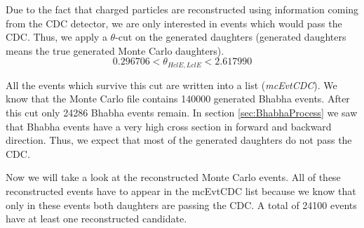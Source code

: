 \documentclass[a4paper,11pt,twosided,final,german,openbib,pdftex,listof=totoc,bibliography=totoc]{scrbook}
\begin{document}
Due to the fact that charged particles are reconstructed using information coming from the CDC detector, we are only interested in events which would pass the CDC. Thus, we apply a $\theta$-cut on the generated daughters (generated daughters means the true generated Monte Carlo daughters). 
\begin{equation}
	0.296706 < \theta_{HclE,LclE} < 2.617990
\end{equation}

All the events which survive this cut are written into a list (\textit{mcEvtCDC}). We know that the Monte Carlo file contains 140000 generated Bhabha events. After this cut only 24286 Bhabha events remain.
In section \ref{sec:BhabhaProcess} we saw that Bhabha events have a very high cross section in forward and backward  direction. Thus, we expect that most of the generated daughters do not pass the CDC. 
\newline

Now we will take a look at the reconstructed Monte Carlo events. All of these reconstructed events have to appear in the mcEvtCDC list because we know that only in these events both daughters are passing the CDC. A total of 24100 events have at least one reconstructed candidate.
\end{document}

